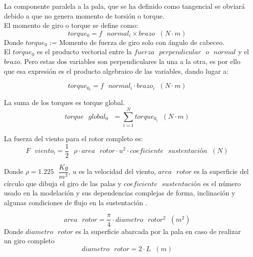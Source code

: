 La componente paralela a la pala, que se ha definido como tangencial se obviará debido a que no genera momento de torsión o torque.\\
  
El momento de giro o torque se define como:
  \begin{equation}
  torque_0 = f \text{ } normal_i \times brazo \hspace{7pt} (N \cdot m)
  \label{def:torque_inicial}
 \end{equation}
 Donde $torque_0$ := Momento de fuerza de giro solo con ángulo de cabeceo.\\


El $torque_0$ es el producto vectorial entre la $fuerza  \text{ }perpendicular \text{ } o \text{ } normal$ y el $brazo$. Pero estas dos variables son perpendiculares la una a la otra, es por ello que esa expresión es el producto algebraico de las variables, dando lugar a:
 
 
  \begin{equation}
  torque_{0_i} = f \text{ } normal_i \cdot brazo_i \hspace{7pt} (N \cdot m)
 \label{def:torque_algebraico_inicial}
 \end{equation}
 
 La suma de los torques es torque global.
 \begin{equation}
  torque \text{ } global_0 \text{ } = \sum_{i=1}^{N} torque_{0_i} \hspace{7pt} (N \cdot m)
\label{def:torque_global}
\end{equation}
 
 
La fuerza del viento para el rotor completo es:
 \begin{equation}
  F \text{ } viento_i = \dfrac{1}{2} \text{ } \rho \cdot area \text{ } rotor \cdot u^2 \cdot coeficiente \text{ } sustentación \hspace{7pt} (N)
   \end{equation}
   
    Donde $\rho = 1.225 \text{ } \dfrac{Kg}{m^3}$, $u$ es la velocidad del viento, $area \text{ } rotor$ es la superficie del círculo que dibuja el giro de las palas y $coeficiente \text{ } sustentación$ es el número usado en la modelación y sus dependencias complejas de forma, inclinación y algunas condiciones de flujo en la sustentación \cite{Hall2021}.
    
  \begin{equation}
  area \text{ } rotor = \dfrac{\pi}{4} \cdot diametro \text{ } rotor^2 \hspace{7pt} (m^2) 
  \end{equation}
  Donde $diametro \text{ } rotor $ es la superficie abarcada por la pala en caso de realizar un giro completo
  \begin{equation}
  diametro \text{ } rotor = 2 \cdot L \hspace{7pt} (m)
 \end{equation}

